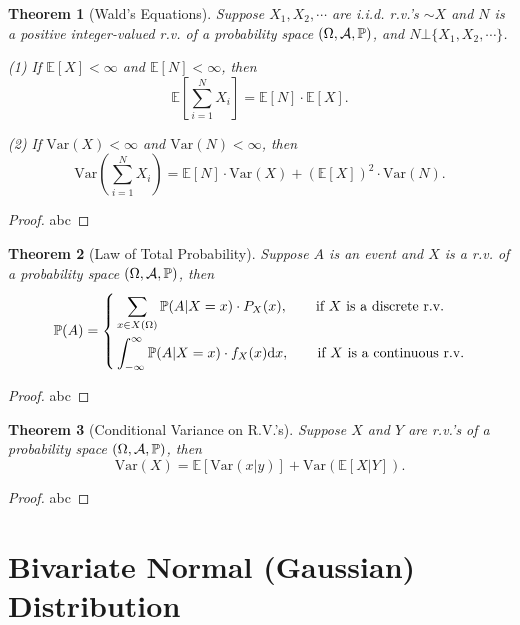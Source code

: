 \documentclass[openany,12pt]{book}
\newtheorem{theorem}{Theorem}[chapter]
\begin{document}
\begin{theorem}[Wald's Equations]
  Suppose $X_{1}, X_{2}, \cdots$ are i.i.d. r.v.'s $\sim X$ and $N$
  is a positive integer-valued r.v. of a probability space $(\Omega,\mathcal{A},\mathbb{P})$, and $N\bot\{ X_{1}, X_{2}, \cdots\}$.

  (1) If $\mathbb{E}[X] < \infty$ and
  $\mathbb{E}\left[ N \right] < \infty$, then
  \[\mathbb{E}\left[ \sum_{i = 1}^{N}X_{i} \right] = \mathbb{E}\left[ N \right] \cdot \mathbb{E}[X].\]

  (2) If $\mathrm{Var}(X) < \infty$ and $\mathrm{Var}(N) < \infty$, then
  \[\mathrm{Var}\left( \sum_{i = 1}^{N}X_{i} \right)= \mathbb{E}[N] \cdot \mathrm{Var}(X) + \left( \mathbb{E}[X] \right)^{2} \cdot \mathrm{Var}(N).\]
\end{theorem}

\begin{proof}
  abc
\end{proof}

\begin{theorem}[Law of Total Probability]
  Suppose $A$ is an event and $X$ is a r.v. of a probability space $(\Omega,\mathcal{A},\mathbb{P})$, then
  \[\mathbb{P}(A)= \left\{ \begin{aligned}
       & \sum_{x \in X(\Omega)}^{}{\mathbb{P}(A|X = x) \cdot P_{X}(x)},\qquad \text{if}~X~\text{is a discrete r.v.}            \\
       & \int_{- \infty}^{\infty} \mathbb{P}( A | X = x) \cdot f_{X}( x)\mathrm{d} x,\qquad\text{if}~X~\text{is a continuous r.v.} \\
    \end{aligned} \right.\]
\end{theorem}

\begin{proof}
  abc
\end{proof}

\begin{theorem}[Conditional Variance on R.V.'s]
  Suppose $X$ and $Y$ are r.v.'s of a probability space $(\Omega,\mathcal{A},\mathbb{P})$, then
  \[\mathrm{Var}(X)= \mathbb{E}[\mathrm{Var}(x|y)] + \mathrm{Var}(\mathbb{E}[X | Y]).\]
\end{theorem}

\begin{proof}
  abc
\end{proof}

\section{Bivariate Normal (Gaussian) Distribution}
\end{document}
